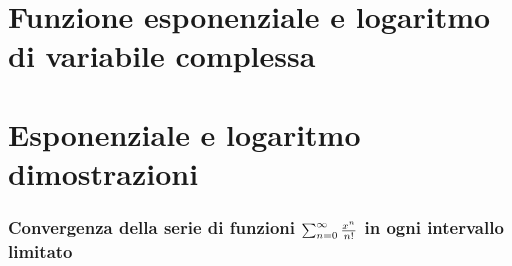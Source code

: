 \documentclass[letterpaper,10pt,italian]{jupyterBook}
\begin{document}
\section{Funzione esponenziale e logaritmo di variabile complessa}
\label{\detokenize{ch/exponential_logarithm:funzione-esponenziale-e-logaritmo-di-variabile-complessa}}
\sphinxAtStartPar
{} 

\sphinxstepscope


\section{Esponenziale e logaritmo \sphinxhyphen{} dimostrazioni}
\label{\detokenize{ch/exponential_logarithm-proof:esponenziale-e-logaritmo-dimostrazioni}}\label{\detokenize{ch/exponential_logarithm-proof:math-hs-exp-log-proof}}\label{\detokenize{ch/exponential_logarithm-proof::doc}}\label{\detokenize{ch/exponential_logarithm-proof:math-hs-exp-log-proof-convergence}}

\subsubsection*{Convergenza della serie di funzioni \protect\(\sum_{n=0}^{\infty} \frac{x^n}{n!}\protect\) in ogni intervallo limitato}
\end{document}
